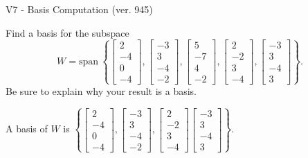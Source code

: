 \begin{exercise}
  \begin{exerciseTitle}V7 - Basis Computation (ver. 945)\end{exerciseTitle}
  \begin{exerciseStatement}
    Find a basis for the subspace 
\[W=\mathrm{span}\ \left\{\left[\begin{array}{r}
2 \\
-4 \\
0 \\
-4
\end{array}\right] , \left[\begin{array}{r}
-3 \\
3 \\
-4 \\
-2
\end{array}\right] , \left[\begin{array}{r}
5 \\
-7 \\
4 \\
-2
\end{array}\right] , \left[\begin{array}{r}
2 \\
-2 \\
3 \\
-4
\end{array}\right] , \left[\begin{array}{r}
-3 \\
3 \\
-4 \\
3
\end{array}\right]\right\}.\]
 Be sure to explain why your result is a basis.


  \end{exerciseStatement}
  \begin{exerciseAnswer}
   A basis of \(W\) is  \(\left\{\left[\begin{array}{r}
2 \\
-4 \\
0 \\
-4
\end{array}\right] , \left[\begin{array}{r}
-3 \\
3 \\
-4 \\
-2
\end{array}\right] , \left[\begin{array}{r}
2 \\
-2 \\
3 \\
-4
\end{array}\right] \left[\begin{array}{r}
-3 \\
3 \\
-4 \\
3
\end{array}\right]\right\}\).
  


  \end{exerciseAnswer}
\end{exercise}
